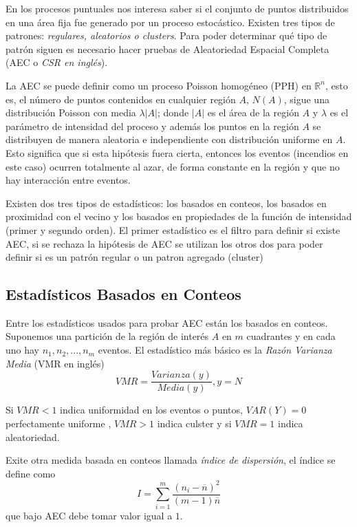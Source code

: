 \documentclass[12,]{article}
\begin{document}
En los procesos puntuales nos interesa saber si el conjunto de puntos
distribuidos en una área fija fue generado por un proceso estocástico.
Existen tres tipos de patrones: \emph{regulares, aleatorios o clusters}.
Para poder determinar qué tipo de patrón siguen es necesario hacer
pruebas de Aleatoriedad Espacial Completa (AEC o \emph{CSR en inglés}).

La AEC se puede definir como un proceso Poisson homogéneo (PPH) en
$\mathbb{R}^n$, esto es, el número de puntos contenidos en cualquier
región $A$, $N(A)$, sigue una distribución Poisson con media
$\lambda \vert A \vert$; donde $\vert A \vert$ es el área de la región
$A$ y $\lambda$ es el parámetro de intensidad del proceso y además los
puntos en la región $A$ se distribuyen de manera aleatoria e
independiente con distribución uniforme en $A$. Esto significa que si
esta hipótesis fuera cierta, entonces los eventos (incendios en este
caso) ocurren totalmente al azar, de forma constante en la región y que
no hay interacción entre eventos.

Existen dos tres tipos de estadísticos: los basados en conteos, los
basados en proximidad con el vecino y los basados en propiedades de la
función de intensidad (primer y segundo orden). El primer estadístico es
el filtro para definir si existe AEC, si se rechaza la hipótesis de AEC
se utilizan los otros dos para poder definir si es un patrón regular o
un patron agregado (cluster)

\subsection{Estadísticos Basados en
Conteos}\label{estadisticos-basados-en-conteos}

Entre los estadísticos usados para probar AEC están los basados en
conteos. Suponemos una partición de la región de interés $A$ en $m$
cuadrantes y en cada uno hay $n_1, n_2, ..., n_m$ eventos. El
estadístico más básico es la \textit{Razón Varianza Media} (VMR en
inglés) \[
VMR = \frac{Varianza(y)}{Media(y)}, y = N
\]

Si $VMR < 1$ indica uniformidad en los eventos o puntos, $VAR(Y) = 0$
perfectamente uniforme , $VMR > 1$ indica culster y si $VMR = 1$ indica
aleatoriedad.

Exite otra medida basada en conteos llamada \emph{índice de dispersión},
el índice se define como\\\[
I = \sum\limits_{i=1}^m \dfrac{(n_i - \overline{n})^2}{(m-1) \overline{n}}
\] que bajo AEC debe tomar valor igual a $1$.
\end{document}
